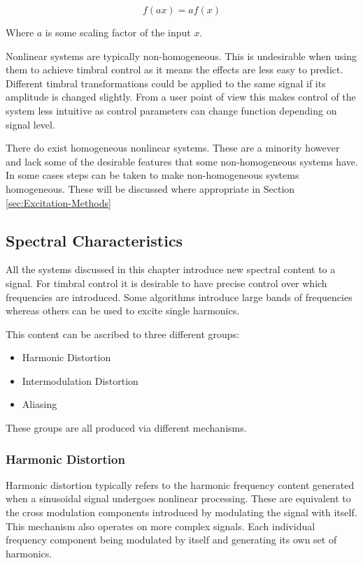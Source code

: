 		\[ f(ax) = af(x) \]

		Where $a$ is some scaling factor of the input $x$.
		
		Nonlinear systems are typically non-homogeneous. This is undesirable when using them to achieve timbral
		control as it means the effects are less easy to predict. Different timbral transformations could be applied
		to the same signal if its amplitude is changed slightly. From a user point of view this makes control of the
		system less intuitive as control parameters can change function depending on signal level.


		There do exist homogeneous nonlinear systems. These are a minority however and lack some of the desirable
		features that some non-homogeneous systems have. In some cases steps can be taken to make non-homogeneous
		systems homogeneous. These will be discussed where appropriate in Section \ref{sec:Excitation-Methods}

	\subsection{Spectral Characteristics}
	\label{sec:Excitation-Evaluation-SpectralCharacteristics}
		All the systems discussed in this chapter introduce new spectral content to a signal. For timbral control
		it is desirable to have precise control over which frequencies are introduced. Some algorithms introduce
		large bands of frequencies whereas others can be used to excite single harmonics. 
		
		This content can be ascribed to three different groups:

		\begin{itemize}
			\item Harmonic Distortion
			\item Intermodulation Distortion
			\item Aliasing
		\end{itemize}

		These groups are all produced via different mechanisms. 

		\subsubsection*{Harmonic Distortion}
			Harmonic distortion typically refers to the harmonic frequency content generated when a sinusoidal
			signal undergoes nonlinear processing. These are equivalent to the cross modulation components
			introduced by modulating the signal with itself. This mechanism also operates on more complex
			signals. Each individual frequency component being modulated by itself and generating its own set
			of harmonics.

